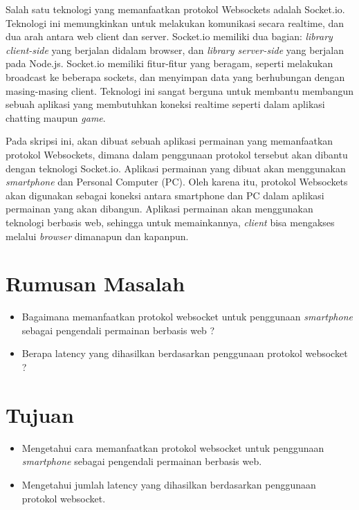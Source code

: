 \documentclass[a4paper,twoside]{article}
\begin{document}
Salah satu teknologi yang memanfaatkan protokol Websockets adalah Socket.io. Teknologi ini memungkinkan untuk melakukan komunikasi secara realtime, dan dua arah antara web client dan server. Socket.io memiliki dua bagian: \textit{library client-side} yang berjalan didalam browser, dan \textit{library server-side} yang berjalan pada Node.js. Socket.io memiliki fitur-fitur yang beragam, seperti melakukan broadcast ke beberapa sockets, dan menyimpan data yang berhubungan dengan masing-masing client. Teknologi ini sangat berguna untuk membantu membangun sebuah aplikasi yang membutuhkan koneksi realtime seperti dalam aplikasi chatting maupun \textit{game}.

Pada skripsi ini, akan dibuat sebuah aplikasi permainan yang memanfaatkan protokol Websockets, dimana dalam penggunaan protokol tersebut akan dibantu dengan teknologi Socket.io. Aplikasi permainan yang dibuat akan menggunakan \textit{smartphone} dan Personal Computer (PC). Oleh karena itu, protokol Websockets akan digunakan sebagai koneksi antara smartphone dan PC dalam aplikasi permainan yang akan dibangun. Aplikasi permainan akan menggunakan teknologi berbasis web, sehingga untuk memainkannya, \textit{client} bisa mengakses melalui \textit{browser} dimanapun dan kapanpun.

\section{Rumusan Masalah}
\begin{itemize}
	\item Bagaimana memanfaatkan protokol websocket untuk penggunaan \textit{smartphone} sebagai pengendali permainan berbasis web ?
	\item Berapa latency yang dihasilkan berdasarkan penggunaan protokol websocket ? 
\end{itemize}

\section{Tujuan}
\begin{itemize}
	\item Mengetahui cara memanfaatkan protokol websocket untuk penggunaan \textit{smartphone} sebagai pengendali permainan berbasis web.
	\item Mengetahui jumlah latency yang dihasilkan berdasarkan penggunaan protokol websocket.
\end{itemize}
\end{document}
